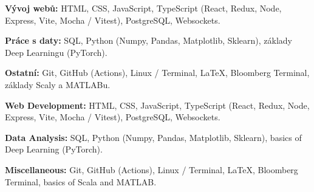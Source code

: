 \ifczech

\textbf{Vývoj webů:} HTML, CSS, JavaScript, TypeScript (React, Redux, Node, Express, Vite, Mocha / Vitest), PostgreSQL, Websockets. \par
\textbf{Práce s daty:} SQL, Python (Numpy, Pandas, Matplotlib, Sklearn), základy Deep Learningu (PyTorch). \par
\textbf{Ostatní:} Git, GitHub (Actions), Linux / Terminal, LaTeX, Bloomberg Terminal, základy Scaly a MATLABu. \par

\else

\textbf{Web Development:} HTML, CSS, JavaScript, TypeScript (React, Redux, Node, Express, Vite, Mocha / Vitest), PostgreSQL, Websockets. \par
\textbf{Data Analysis:} SQL, Python (Numpy, Pandas, Matplotlib, Sklearn), basics of Deep Learning (PyTorch). \par
\textbf{Miscellaneous:} Git, GitHub (Actions), Linux / Terminal, LaTeX, Bloomberg Terminal, basics of Scala and MATLAB. \par

\fi